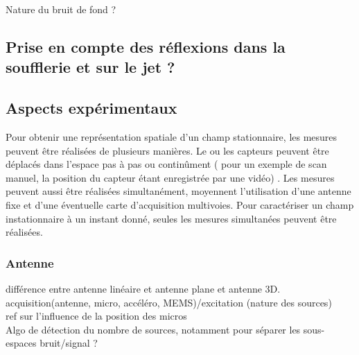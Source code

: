 Nature du bruit de fond ?

\subsection{Prise en compte des réflexions dans la soufflerie et sur le jet ?}

\subsection{Aspects expérimentaux}
Pour obtenir une représentation spatiale d'un champ stationnaire, les mesures peuvent être réalisées de plusieurs manières. Le ou les capteurs peuvent être déplacés dans l'espace pas à pas ou continûment (\cite{Comesana2013} pour un exemple de scan manuel, la position du capteur étant enregistrée par une vidéo) . Les mesures peuvent aussi être réalisées simultanément, moyennent l'utilisation d'une antenne fixe et d'une éventuelle carte d'acquisition multivoies. Pour caractériser un champ instationnaire à un instant donné, seules les mesures simultanées peuvent être réalisées.

\subsubsection{Antenne}
différence entre antenne linéaire et antenne plane et antenne 3D.\\

acquisition(antenne, micro, accéléro, MEMS)/excitation (nature des sources)\\

ref sur l'influence de la position des micros\\



Algo de détection du nombre de sources, notamment pour séparer les sous-espaces bruit/signal ?

